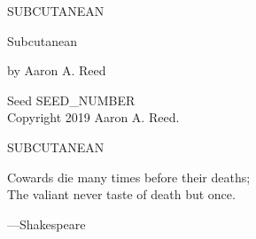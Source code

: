 \thispagestyle{empty}
SUBCUTANEAN
\clearpage

\thispagestyle{empty}
\null %
\clearpage

\thispagestyle{empty}
Subcutanean

by Aaron A. Reed
\clearpage

\thispagestyle{empty}
\null\vfill
Seed SEED_NUMBER \\
Copyright 2019 Aaron A. Reed.
\clearpage

\thispagestyle{empty}
SUBCUTANEAN
\clearpage
\cleartorecto

\thispagestyle{empty}
\vspace*{10\nbs}
\begin{adjustwidth}{7em}{7em}
Cowards die many times before their deaths;\\
The valiant never taste of death but once.\par
\stake\hfill---Shakespeare\par
\end{adjustwidth}
\clearpage

